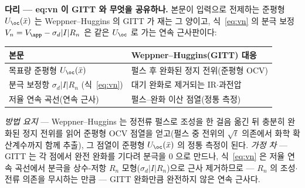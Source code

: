 
\begin{srcbox}
\textbf{다리 --- eq:vn 이 GITT 와 무엇을 공유하나.} 본문이 입력으로 전제하는 준평형 $U_\oc(\bar x)$ 는
Weppner--Huggins 의 GITT\cite{weppner_huggins1977} 가 재는 그 양이고, 식~\eqref{eq:vn} 의 분극 보정
$V_n=V_\app-\sigma_d|I|R_n$ 은 같은 $U_\oc$ 로 가는 연속 근사판이다:
\begin{center}\footnotesize
\begin{tabular}{@{}ll@{}}
\hline
본문 & Weppner--Huggins\cite{weppner_huggins1977}(GITT) 대응 \\
\hline
목표량 준평형 $U_\oc(\bar x)$ & 펄스 후 완화된 정지 전위(준평형 OCV) \\
분극 보정항 $\sigma_d|I|R_n$ (식~\eqref{eq:vn}) & 대기 완화로 제거되는 IR$\cdot$과전압 \\
저율 연속 곡선(연속 근사) & 펄스--완화 이산 점열(정통 측정) \\
\hline
\end{tabular}
\end{center}
\emph{방법 요지} --- Weppner--Huggins 는 정전류 펄스로 조성을 한 걸음 옮긴 뒤 충분히 완화된 정지 전위를 읽어
준평형 OCV 점열을 얻고(펄스 중 전위의 $\sqrt t$ 의존에서 화학 확산계수까지 함께 추출), 그 점열이 준평형
$U_\oc(\bar x)$ 의 정통 측정이 된다. \emph{가정 차} --- GITT 는 각 점에서 완전 완화를 기다려 분극을 $0$ 으로
만드나, 식~\eqref{eq:vn} 은 저율 연속 곡선에서 분극을 상수-저항 $R_n$ 모형($\sigma_d|I|R_n$)으로 근사 제거하므로
--- $R_n$ 의 조성$\cdot$전류 의존을 무시하는 만큼 --- GITT 완화만큼 완전하지 않은 연속 근사다.
\end{srcbox}
